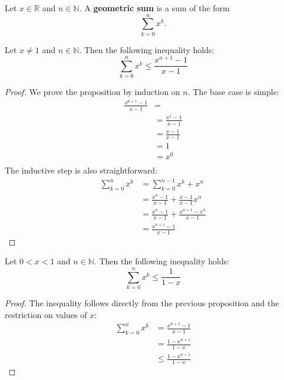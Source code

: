\begin{definition}
    \label{def:geom_sum}
    \leanok
    Let $x \in \mathbb{R}$ and $n \in \mathbb{N}$. A \textbf{geometric sum}
    is a sum of the form
    \[
        \sum_{k=0}^n x^k.
    \]
\end{definition}

\begin{proposition}
    \label{prop:geom_sum_base_neq_one}
    \leanok
    Let $x \neq 1$ and $n \in \mathbb{N}$. Then the following inequality 
    holds:
    \[
        \sum_{k=0}^n x^k \leq \frac{x^{n+1} - 1}{x - 1}
    \]
\end{proposition}

\begin{proof}
    \leanok
    We prove the proposition by induction on $n$. The base case is simple:
    \begin{align*}
        \frac{x^{0+1} - 1}{x-1} &= \\
        &= \frac{x^1 - 1}{x-1} \\
        &= \frac{x-1}{x-1} \\
        &= 1 \\
        &= x^0 \\
    \end{align*}
    The inductive step is also straightforward:
    \begin{align*}
        \sum_{k=0}^{n} x^k &= \sum_{k=0}^{n-1} x^k + x^n \\
        &= \frac{x^n - 1}{x-1} + \frac{x-1}{x-1} x^n \\
        &= \frac{x^n - 1}{x-1} + \frac{x^{n+1} - x^n}{x-1} \\
        &= \frac{x^{n+1} - 1}{x-1}
    \end{align*}
\end{proof}

\begin{proposition}
    \label{prop:geom_sum_base_lt_one}
    \leanok
    Let $0 < x < 1$ and $n \in \mathbb{N}$. Then the following inequality 
    holds:
    \[
        \sum_{k=0}^n x^k \leq \frac{1}{1-x}
    \]
\end{proposition}

\begin{proof}
    \leanok
    The inequality follows directly from the previous proposition and the 
    restriction on values of $x$:
    \begin{align*}
        \sum_{k=0}^n x^k &= \frac{x^{n+1} - 1}{x-1} \\
        &= \frac{1 - x^{n+1}}{1-x} \\
        &\leq \frac{1 - x^{n+1}}{1-x}
    \end{align*}
\end{proof}


